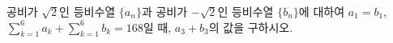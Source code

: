 공비가 $\sqrt{2}$인 등비수열 $\{a_n\}$과 공비가 $-\sqrt{2}$인 등비수열 $\{b_n\}$에 대하여 $a_1=b_1$, $\displaystyle\sum_{k=1}^{6}a_k+\sum_{k=1}^{6}b_k=168$일 때, $a_3+b_3$의 값을 구하시오.

